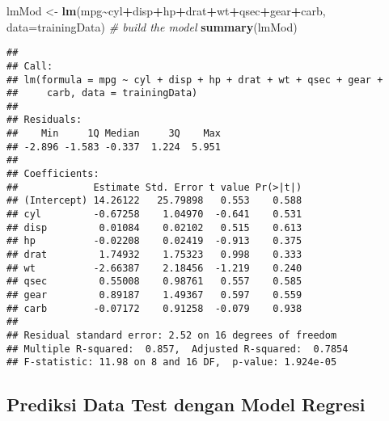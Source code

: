 \documentclass[
]{article}
\newenvironment{Shaded}{\begin{snugshade}}{\end{snugshade}}
\newcommand{\AttributeTok}[1]{\textcolor[rgb]{0.13,0.29,0.53}{#1}}
\newcommand{\CommentTok}[1]{\textcolor[rgb]{0.56,0.35,0.01}{\textit{#1}}}
\newcommand{\FunctionTok}[1]{\textcolor[rgb]{0.13,0.29,0.53}{\textbf{#1}}}
\newcommand{\NormalTok}[1]{#1}
\newcommand{\OtherTok}[1]{\textcolor[rgb]{0.56,0.35,0.01}{#1}}
\newcommand{\SpecialCharTok}[1]{\textcolor[rgb]{0.81,0.36,0.00}{\textbf{#1}}}
\begin{document}
\begin{Shaded}
\begin{Highlighting}[]
\NormalTok{lmMod }\OtherTok{\textless{}{-}} \FunctionTok{lm}\NormalTok{(mpg}\SpecialCharTok{\textasciitilde{}}\NormalTok{cyl}\SpecialCharTok{+}\NormalTok{disp}\SpecialCharTok{+}\NormalTok{hp}\SpecialCharTok{+}\NormalTok{drat}\SpecialCharTok{+}\NormalTok{wt}\SpecialCharTok{+}\NormalTok{qsec}\SpecialCharTok{+}\NormalTok{gear}\SpecialCharTok{+}\NormalTok{carb, }\AttributeTok{data=}\NormalTok{trainingData) }\CommentTok{\# build the model}
\FunctionTok{summary}\NormalTok{(lmMod)}
\end{Highlighting}
\end{Shaded}

\begin{verbatim}
## 
## Call:
## lm(formula = mpg ~ cyl + disp + hp + drat + wt + qsec + gear + 
##     carb, data = trainingData)
## 
## Residuals:
##    Min     1Q Median     3Q    Max 
## -2.896 -1.583 -0.337  1.224  5.951 
## 
## Coefficients:
##             Estimate Std. Error t value Pr(>|t|)
## (Intercept) 14.26122   25.79898   0.553    0.588
## cyl         -0.67258    1.04970  -0.641    0.531
## disp         0.01084    0.02102   0.515    0.613
## hp          -0.02208    0.02419  -0.913    0.375
## drat         1.74932    1.75323   0.998    0.333
## wt          -2.66387    2.18456  -1.219    0.240
## qsec         0.55008    0.98761   0.557    0.585
## gear         0.89187    1.49367   0.597    0.559
## carb        -0.07172    0.91258  -0.079    0.938
## 
## Residual standard error: 2.52 on 16 degrees of freedom
## Multiple R-squared:  0.857,  Adjusted R-squared:  0.7854 
## F-statistic: 11.98 on 8 and 16 DF,  p-value: 1.924e-05
\end{verbatim}

\subsection{Prediksi Data Test dengan Model
Regresi}\label{prediksi-data-test-dengan-model-regresi}

\begin{Shaded}
\end{Shaded}
\end{document}
